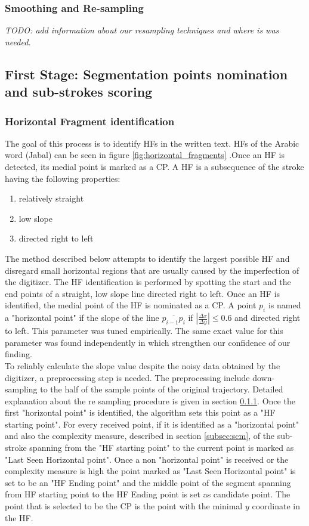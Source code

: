 \documentclass[journal,compsoc]{IEEEtran}
\begin{document}
\subsubsection{Smoothing and Re-sampling}
\emph{TODO: add information about our resampling techniques and where is was needed.}

\subsection{First Stage: Segmentation points nomination and sub-strokes scoring}
\subsubsection{Horizontal Fragment identification}
The goal of this process is to identify HFs in the written text. HFs of the Arabic word  (Jabal) can be seen in figure \ref{fig:horizontal_fragments} .Once an HF is detected, its medial point is marked as a CP. A HF is a subsequence of the stroke having the following properties: 
\begin{enumerate}
\item relatively straight
\item low slope
\item directed right to left 
\end{enumerate}
The method described below attempts to identify the largest possible HF and disregard small horizontal regions that are usually caused by the imperfection of the digitizer. The HF identification is performed by spotting the start and the end points of a straight, low slope line directed right to left. Once an HF is identified, the medial point of the HF is nominated as a CP.
A point $p_{i}$ is named a "horizontal point" if the slope of the line $\overline{p_{i-1}p_{i}}$ if $\left|\frac{\Delta x}{\Delta y}\right|\leq0.6$ and directed right to left. This parameter was tuned empirically.
The same exact value for this parameter was found independently in \cite{daifallah2009recognition} which strengthen our confidence of our finding.\\
To reliably calculate the slope value despite the noisy data obtained by the digitizer, a preprocessing step is needed. The preprocessing include down-sampling to the half of the sample points of the original trajectory. Detailed explanation about the re sampling procedure is given in section \ref{}.
Once the first "horizontal point" is identified, the algorithm sets this point as a "HF starting point". For every received point, if it is identified as a "horizontal point" and also the complexity measure, described in section \ref{subsec:scm}, of the sub-stroke spanning from the "HF starting point" to the current point is marked as "Last Seen Horizontal point". Once a non "horizontal point" is received or the complexity measure is high the point marked as "Last Seen Horizontal point" is set to be an "HF Ending point" and the middle point of the segment spanning from HF starting point to the HF Ending point is set as candidate point. The point that is selected to be the CP is the point with the minimal $y$ coordinate in the HF.
\end{document}
